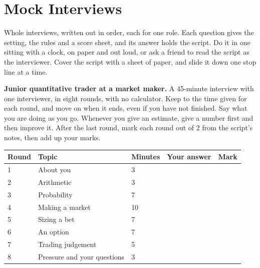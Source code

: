 \chapter{Mock Interviews}\label{ch:iv2:mock-interviews}

\begin{ivtrains}
Whole interviews, written out in order, each for one role. Each question gives the setting, the rules and a score sheet, and its answer holds the script. Do it in one sitting with a clock, on paper and out loud, or ask a friend to read the script as the interviewer. Cover the script with a sheet of paper, and slide it down one stop line at a time.
\end{ivtrains}

\begin{question}\label{iq:iv2:mock-interviews:1}
\textbf{Junior quantitative trader at a market maker.} A 45-minute interview with one interviewer, in eight rounds, with no calculator. Keep to the time given for each round, and move on when it ends, even if you have not finished. Say what you are doing as you go. Whenever you give an estimate, give a number first and then improve it. After the last round, mark each round out of 2 from the script's notes, then add up your marks.

\medskip
\begin{tabular}{@{}l|l|l|l|l@{}}
Round & Topic & Minutes & Your answer & Mark \\ \hline
1 & About you & 3 & & \\[6pt]\hline
2 & Arithmetic & 3 & & \\[6pt]\hline
3 & Probability & 7 & & \\[6pt]\hline
4 & Making a market & 10 & & \\[6pt]\hline
5 & Sizing a bet & 7 & & \\[6pt]\hline
6 & An option & 7 & & \\[6pt]\hline
7 & Trading judgement & 5 & & \\[6pt]\hline
8 & Pressure and your questions & 3 & & \\[6pt]\hline
\end{tabular}
\end{question}
\vfill\clearpage
